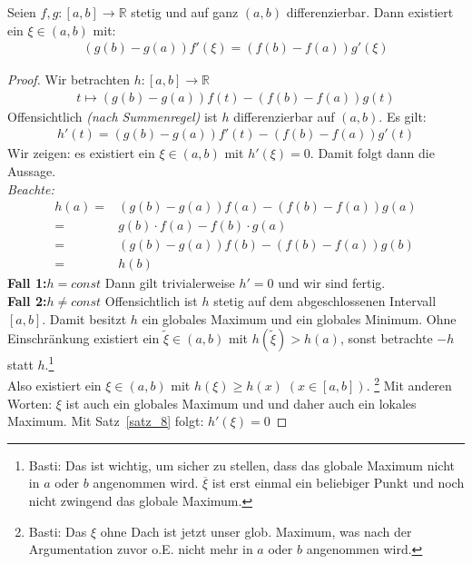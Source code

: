 
\begin{Satz}{
	\label{satz_9}
	Seien $f,g : [a,b] \rightarrow \mathbb{R}$ stetig und auf ganz 
	$\left( a, b \right)$ differenzierbar. Dann existiert ein 
	$\xi \in (a,b) $ mit:
	\begin{align*}
		\left( g(b)- g(a)\right)f'(\xi) = 
		\left( f(b) - f(a) \right) g'(\xi)
	\end{align*}
}\end{Satz}

\begin{proof}
	Wir betrachten $h: [a,b] \rightarrow \mathbb{R}$ 
	\begin{align*}
		t \mapsto \left( g(b) -g(a)\right)f(t) - \left(f(b)-f(a)\right)g(t)
	\end{align*}
	Offensichtlich \emph{(nach Summenregel)} ist $h$ differenzierbar auf $(a,b)$.
	Es gilt:
	\begin{align*}
		h'(t) = \left(g(b)-g(a)\right)f'(t) - \left(f(b)-f(a)\right)g'(t)
	\end{align*}
	Wir zeigen: es existiert ein $\xi \in (a,b)$ mit $h'(\xi) = 0$. Damit folgt 
	dann die Aussage. \\
	\emph{Beachte:} 
	\begin{align*}
		h(a) = & \left(g(b)-g(a)\right)f(a) - \left(f(b)-f(a)\right)g(a) \\
		= & g(b) \cdot f(a) - f(b) \cdot g(a) \\
		= & \left(g(b) - g(a)\right)f(b) - \left(f(b)-f(a)\right)g(b) \\
		= & h(b)
	\end{align*}
	\textbf{Fall 1:}$h = const$ Dann gilt trivialerweise $h' = 0$ 
	und wir sind fertig. \\
	\textbf{Fall 2:}$h \neq const$ Offensichtlich ist $h$ stetig auf dem 
	abgeschlossenen Intervall $[a,b]$. Damit besitzt $h$ ein globales Maximum und 
	ein globales Minimum. Ohne Einschränkung existiert ein $\tilde{\xi} \in (a,b)$
	 mit $h(\tilde{\xi}) > h(a)$, sonst betrachte $-h$ statt $h$.\footnote{Basti: Das ist wichtig, um sicher zu stellen, dass  das globale Maximum nicht in $a$ oder $b$ angenommen wird. $\overline\xi$ ist erst einmal ein beliebiger Punkt und noch nicht zwingend das globale Maximum.} \\
	 Also existiert ein $\xi \in (a,b)$ mit $h(\xi) \geq h(x)\;
	  (x \in [a,b])$.  \footnote{Basti: Das $\xi$ ohne Dach ist jetzt unser glob. Maximum, was nach der Argumentation zuvor o.E. nicht mehr in $a$ oder $b$ angenommen wird.}
	 Mit anderen Worten: $\xi$ ist auch ein globales Maximum und und daher auch 
	 ein lokales Maximum. Mit Satz~\ref{satz_8}
	 folgt: $h'(\xi) = 0$
	 
\end{proof}
	
